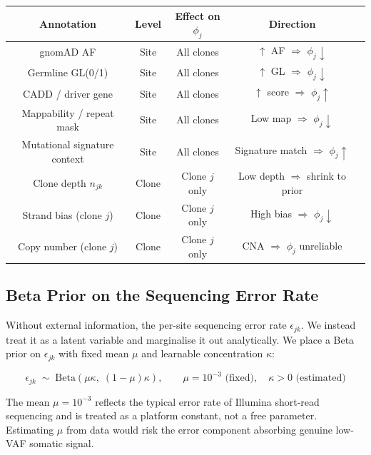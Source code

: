 \documentclass{article}
\begin{document}
\begin{center}
\renewcommand{\arraystretch}{1.4}
\begin{tabular}{|c|c|c|c|c|}
\toprule
Annotation & Level & Effect on $\phi_j$ & Direction \\
\midrule
gnomAD AF & Site & All clones & $\uparrow$ AF $\Rightarrow$ $\phi_j \downarrow$ \\
Germline GL(0/1) & Site & All clones & $\uparrow$ GL $\Rightarrow$ $\phi_j \downarrow$ \\
CADD / driver gene & Site & All clones & $\uparrow$ score $\Rightarrow$ $\phi_j \uparrow$ \\
Mappability / repeat mask & Site & All clones & Low map $\Rightarrow$ $\phi_j \downarrow$ \\
Mutational signature context & Site & All clones & Signature match $\Rightarrow$ $\phi_j \uparrow$ \\
Clone depth $n_{jk}$ & Clone & Clone $j$ only & Low depth $\Rightarrow$ shrink to prior \\
Strand bias (clone $j$) & Clone & Clone $j$ only & High bias $\Rightarrow$ $\phi_j \downarrow$ \\
Copy number (clone $j$) & Clone & Clone $j$ only & CNA $\Rightarrow$ $\phi_j$ unreliable \\
\bottomrule
\end{tabular}
\end{center}

\subsection*{Beta Prior on the Sequencing Error Rate}

Without external information, the per-site sequencing error rate
$\epsilon_{jk}$. We instead treat it as a latent variable and marginalise it out analytically.  We place a Beta prior on $\epsilon_{jk}$ with fixed mean $\mu$ and learnable concentration $\kappa$:

\begin{equation}
  \epsilon_{jk} \;\sim\; \mathrm{Beta}(\mu\kappa,\;(1-\mu)\kappa),
  \qquad \mu = 10^{-3} \text{ (fixed)}, \quad \kappa > 0 \text{ (estimated)}
  \label{eq:epsprior}
\end{equation}

The mean $\mu = 10^{-3}$ reflects the typical error rate of  Illumina short-read sequencing and is treated as a platform constant, not a free parameter. Estimating $\mu$ from data would risk the error component absorbing genuine low-VAF somatic signal.
\end{document}
